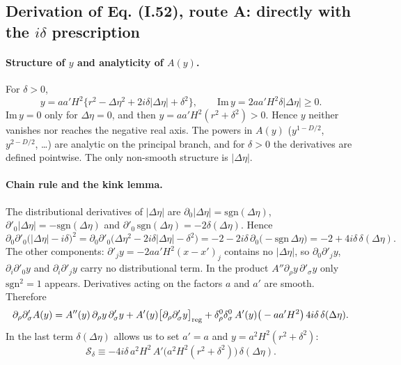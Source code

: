 \subsection{Derivation of Eq. (I.52), route A: directly with the $i\delta$ prescription \tD}

\paragraph{Structure of $y$ and analyticity of $A(y)$.}
For $\delta>0$,
\begin{equation}
y=aa'H^2\big\{r^2-\Delta\eta^2+2i\delta|\Delta\eta|+\delta^2\big\},\qquad \mathrm{Im}\,y=2aa'H^2\delta|\Delta\eta|\ge0 .
\label{eq:ch3-ystruct}
\end{equation}
$\mathrm{Im}\,y=0$ only for $\Delta\eta=0$, and then $y=aa'H^2(r^2+\delta^2)>0$. Hence $y$ neither vanishes nor reaches the negative real axis.
The powers in $A(y)$ ($y^{1-D/2}$, $y^{2-D/2}$, \ldots) are analytic on the principal branch, and for $\delta>0$ the derivatives are defined pointwise.
The only non-smooth structure is $|\Delta\eta|$.

\paragraph{Chain rule and the kink lemma.}
\label{sec:ch3-kink}
The distributional derivatives of $|\Delta\eta|$ are $\partial_0|\Delta\eta|=\mathrm{sgn}(\Delta\eta)$, $\partial'_0|\Delta\eta|=-\mathrm{sgn}(\Delta\eta)$ and
$\partial'_0\,\mathrm{sgn}(\Delta\eta)=-2\delta(\Delta\eta)$. Hence
\begin{equation}
\partial_0\partial'_0\big(|\Delta\eta|-i\delta\big)^2=\partial_0\partial'_0\big(\Delta\eta^2-2i\delta|\Delta\eta|-\delta^2\big)
=-2-2i\delta\,\partial_0\big(-\mathrm{sgn}\,\Delta\eta\big)=-2+4i\delta\,\delta(\Delta\eta).
\label{eq:ch3-kinklemma}
\end{equation}
The other components: $\partial'_jy=-2aa'H^2(x-x')_j$ contains no $|\Delta\eta|$, so $\partial_0\partial'_jy$, $\partial_i\partial'_0y$ and $\partial_i\partial'_jy$ carry no
distributional term. In the product $A''\partial_\rho y\,\partial'_\sigma y$ only $\mathrm{sgn}^2=1$ appears. Derivatives acting on the factors $a$ and $a'$ are smooth. Therefore
\begin{equation}
\partial_\rho\partial'_\sigma A(y)=A''(y)\,\partial_\rho y\,\partial'_\sigma y+A'(y)\big[\partial_\rho\partial'_\sigma y\big]_{\rm reg}
+\delta^0_\rho\delta^0_\sigma\,A'(y)\big(-aa'H^2\big)\,4i\delta\,\delta(\Delta\eta).
\label{eq:ch3-chain}
\end{equation}
In the last term $\delta(\Delta\eta)$ allows us to set $a'=a$ and $y=a^2H^2(r^2+\delta^2)$:
\begin{equation}
\mathcal S_\delta\equiv-4i\delta\,a^2H^2\,A'\big(a^2H^2(r^2+\delta^2)\big)\,\delta(\Delta\eta).
\label{eq:ch3-Sdelta}
\end{equation}

